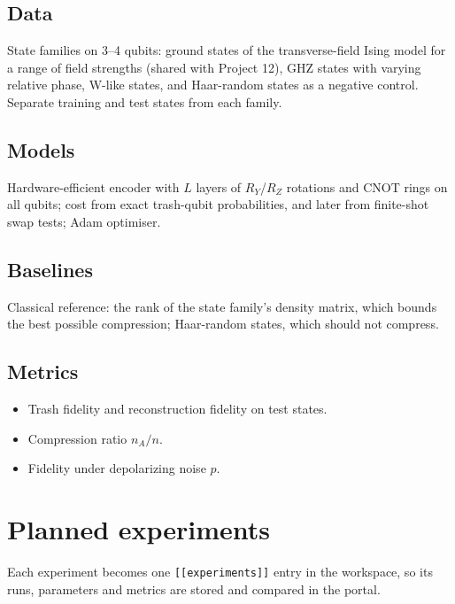\documentclass[11pt,a4paper]{article}
\begin{document}
\subsection{Data}
State families on 3--4 qubits: ground states of the transverse-field Ising model for a range of field
strengths (shared with Project 12), GHZ states with varying relative phase, W-like states, and
Haar-random states as a negative control. Separate training and test states from each family.

\subsection{Models}
Hardware-efficient encoder with $L$ layers of $R_Y$/$R_Z$ rotations and CNOT rings on all qubits;
cost from exact trash-qubit probabilities, and later from finite-shot swap tests; Adam optimiser.

\subsection{Baselines}
Classical reference: the rank of the state family's density matrix, which bounds the best possible
compression; Haar-random states, which should not compress.

\subsection{Metrics}
\begin{itemize}
  \item Trash fidelity and reconstruction fidelity on test states.
  \item Compression ratio $n_A/n$.
  \item Fidelity under depolarizing noise $p$.
\end{itemize}

\section{Planned experiments}
Each experiment becomes one \texttt{[[experiments]]} entry in the workspace, so its runs, parameters
and metrics are stored and compared in the portal.
\end{document}
